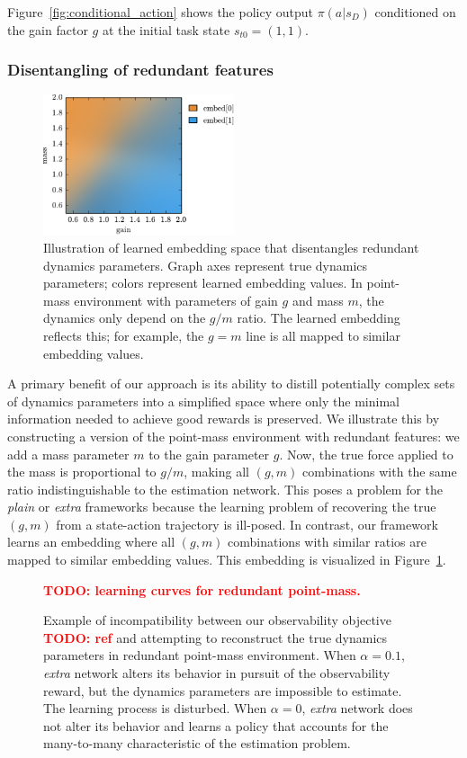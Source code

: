 \documentclass{article}
\newcommand{\TODO}[1]{\textcolor{red}{\textbf{TODO: #1}}}
\newcommand{\plain}{\emph{plain}}
\newcommand{\extra}{\emph{extra}}
\begin{document}
Figure~\ref{fig:conditional_action} shows the policy output $\pi(a|s_D)$ conditioned on
the gain factor $g$ at the initial task state $s_{t0} = (1, 1)$.

\subsubsection{Disentangling of redundant features}

\begin{figure}
\centering
\includegraphics[width=0.5\textwidth]{embed_colors.pdf}
\caption{
Illustration of learned embedding space that disentangles redundant dynamics parameters.
Graph axes represent true dynamics parameters; colors represent learned embedding values.
In point-mass environment with parameters of gain $g$ and mass $m$,
the dynamics only depend on the $g/m$ ratio.
The learned embedding reflects this; for example, the $g=m$ line is all mapped to similar embedding values.
}
\label{fig:embed_colors}
\end{figure}
A primary benefit of our approach is its ability to distill potentially complex sets of dynamics parameters
into a simplified space where only the minimal information needed to achieve good rewards is preserved.
We illustrate this by constructing a version of the point-mass environment with redundant features:
we add a mass parameter $m$ to the gain parameter $g$.
Now, the true force applied to the mass is proportional to $g/m$,
making all $(g, m)$ combinations with the same ratio indistinguishable to the estimation network.
This poses a problem for the \plain{} or \extra{} frameworks
because the learning problem of recovering the true $(g, m)$ from a state-action trajectory is ill-posed.
In contrast, our framework learns an embedding where all $(g, m)$ combinations with similar ratios are mapped to similar embedding values.
This embedding is visualized in Figure~\ref{fig:embed_colors}.


\begin{figure}
\centering
\TODO{learning curves for redundant point-mass.}
\caption{
Example of incompatibility between our observability objective \TODO{ref}
and attempting to reconstruct the true dynamics parameters
in redundant point-mass environment.
When $\alpha = 0.1$, \extra{} network alters its behavior in pursuit of the observability reward, but the dynamics parameters are impossible to estimate.
The learning process is disturbed.
When $\alpha = 0$, \extra{} network does not alter its behavior
and learns a policy that accounts for the many-to-many characteristic of the estimation problem.
}
\label{fig:redundant_fail}
\end{figure}
\end{document}
